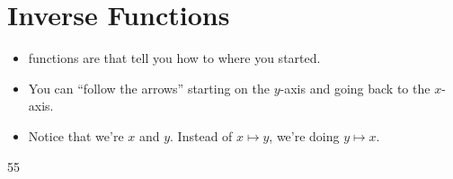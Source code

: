 \section{Inverse Functions}

\begin{minipage}{0.49\textwidth}
    \begin{itemize}
        \item {} functions are  that tell you 
            how to   where you started.    
        \item You can ``follow the arrows'' starting 
            on the $y$-axis and going back to the $x$-axis.\
        \item Notice that we're  $x$ and $y$. 
            Instead of $x\mapsto y$, we're doing 
            $y\mapsto x$.
    \end{itemize}
\end{minipage}
\begin{minipage}{0.5\textwidth}
    \begin{center}
        \begin{myTikzpictureGrid}{0.4} {5}{5}
        \end{myTikzpictureGrid}
    \end{center}
\end{minipage}

